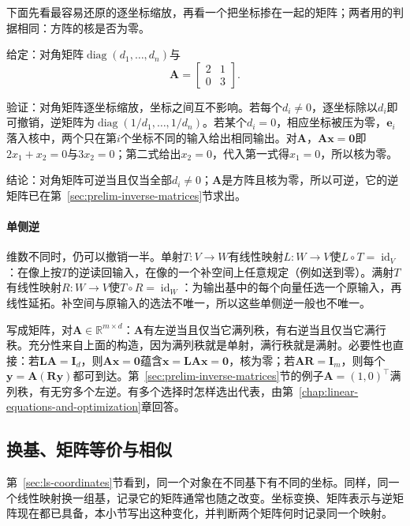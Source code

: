 下面先看最容易还原的逐坐标缩放，再看一个把坐标掺在一起的矩阵；两者用的判据相同：方阵的核是否为零。
\begin{example}[用核判断可逆]
\label{ex:ls-kernel-invertibility}
给定：对角矩阵$\operatorname{diag}(d_1,\ldots,d_n)$与
\[
 \bm A=\begin{bmatrix}2&1\\0&3\end{bmatrix}.
\]

验证：对角矩阵逐坐标缩放，坐标之间互不影响。若每个$d_i\neq0$，逐坐标除以$d_i$即可撤销，逆矩阵为$\operatorname{diag}(1/d_1,\ldots,1/d_n)$。若某个$d_i=0$，相应坐标被压为零，$\bm e_i$落入核中，两个只在第$i$个坐标不同的输入给出相同输出。对$\bm A$，$\bm A\bm x=\bm0$即$2x_1+x_2=0$与$3x_2=0$；第二式给出$x_2=0$，代入第一式得$x_1=0$，所以核为零。

结论：对角矩阵可逆当且仅当全部$d_i\neq0$；$\bm A$是方阵且核为零，所以可逆，它的逆矩阵已在第~\ref{sec:prelim-inverse-matrices}节求出。
\end{example}

\paragraph{单侧逆}
维数不同时，仍可以撤销一半。单射$T:V\to W$有线性映射$L:W\to V$使$L\circ T=\operatorname{id}_V$：在像上按$T$的逆读回输入，在像的一个补空间上任意规定（例如送到零）。满射$T$有线性映射$R:W\to V$使$T\circ R=\operatorname{id}_W$：为输出基中的每个向量任选一个原输入，再线性延拓。补空间与原输入的选法不唯一，所以这些单侧逆一般也不唯一。

写成矩阵，对$\bm A\in\mathbb R^{m\times d}$：$\bm A$有左逆当且仅当它满列秩，有右逆当且仅当它满行秩。充分性来自上面的构造，因为满列秩就是单射，满行秩就是满射。必要性也直接：若$\bm L\bm A=\bm I_d$，则$\bm A\bm x=\bm0$蕴含$\bm x=\bm L\bm A\bm x=\bm0$，核为零；若$\bm A\bm R=\bm I_m$，则每个$\bm y=\bm A(\bm R\bm y)$都可到达。第~\ref{sec:prelim-inverse-matrices}节的例子$\bm A=(1,0)^\top$满列秩，有无穷多个左逆。有多个选择时怎样选出代表，由第~\ref{chap:linear-equations-and-optimization}章回答。

\subsection{换基、矩阵等价与相似}
\label{sec:ls-coordinates-change-of-basis}

第~\ref{sec:ls-coordinates}节看到，同一个对象在不同基下有不同的坐标。同样，同一个线性映射换一组基，记录它的矩阵通常也随之改变。坐标变换、矩阵表示与逆矩阵现在都已具备，本小节写出这种变化，并判断两个矩阵何时记录同一个映射。

